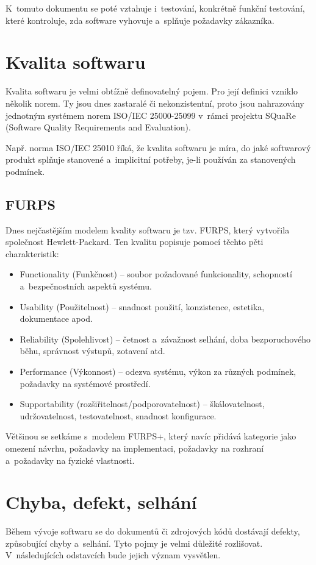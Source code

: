 	K~tomuto dokumentu se poté vztahuje i~testování, konkrétně funkční testování, které kontroluje, zda software vyhovuje a~splňuje požadavky zákazníka.
	
	\section{Kvalita softwaru}
	Kvalita softwaru je velmi obtížně definovatelný pojem. Pro její definici vzniklo několik norem. Ty jsou dnes zastaralé či nekonzistentní, proto jsou nahrazovány jednotným systémem norem ISO/IEC 25000-25099 v~rámci projektu SQuaRe (Software Quality Requirements and Evaluation).
	
	Např. norma ISO/IEC 25010 říká, že kvalita softwaru je míra, do jaké softwarový produkt splňuje stanovené a~implicitní potřeby, je-li používán za stanovených podmínek.
	
		\subsection{FURPS}
		Dnes nejčastějším modelem kvality softwaru je tzv. FURPS, který vytvořila společnost Hewlett-Packard. Ten kvalitu popisuje pomocí těchto pěti charakteristik:
			\begin{itemize}
				\item Functionality (Funkčnost) -- soubor požadované funkcionality, schopností a~bezpečnostních aspektů systému.
				\item Usability (Použitelnost) -- snadnost použití, konzistence, estetika, dokumentace apod.
				\item Reliability (Spolehlivost) -- četnost a~závažnost selhání, doba bezporuchového běhu, správnost výstupů, zotavení atd.
				\item Performance (Výkonnost) -- odezva systému, výkon za různých podmínek, požadavky na systémové prostředí.
				\item Supportability (rozšiřitelnost/podporovatelnost) -- škálovatelnost, udržovatelnost, testovatelnost, snadnost konfigurace.
			\end{itemize}
		Většinou se setkáme s~modelem FURPS+, který navíc přidává kategorie jako omezení návrhu, požadavky na implementaci, požadavky na rozhraní a~požadavky na fyzické vlastnosti.
			
	\section{Chyba, defekt, selhání}
	Během vývoje softwaru se do dokumentů či zdrojových kódů dostávají defekty, způsobující chyby a~selhání. Tyto pojmy je velmi důležité rozlišovat. V~následujících odstavcích bude jejich význam vysvětlen.
	
